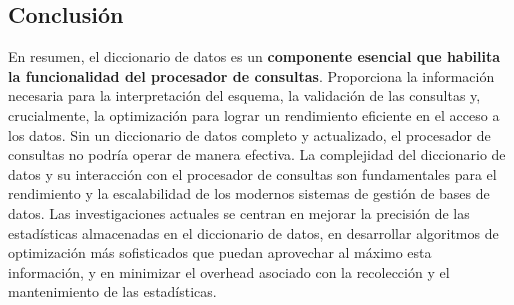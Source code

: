 \subsection{Conclusión}

En resumen, el diccionario de datos es un \textbf{componente esencial que habilita la funcionalidad del procesador de consultas}. Proporciona la información necesaria para la interpretación del esquema, la validación de las consultas y, crucialmente, la optimización para lograr un rendimiento eficiente en el acceso a los datos. Sin un diccionario de datos completo y actualizado, el procesador de consultas no podría operar de manera efectiva. La complejidad del diccionario de datos y su interacción con el procesador de consultas son fundamentales para el rendimiento y la escalabilidad de los modernos sistemas de gestión de bases de datos.  Las investigaciones actuales se centran en mejorar la precisión de las estadísticas almacenadas en el diccionario de datos, en desarrollar algoritmos de optimización más sofisticados que puedan aprovechar al máximo esta información, y en minimizar el overhead asociado con la recolección y el mantenimiento de las estadísticas.